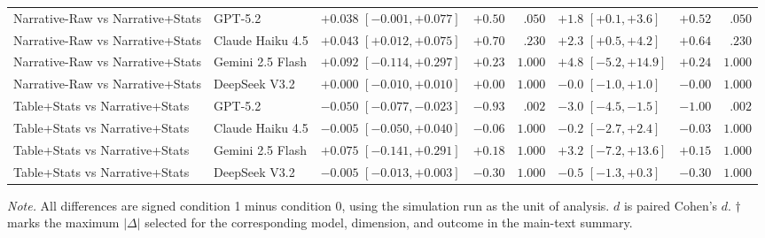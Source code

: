 \begin{table}[t]
\begin{tabular}{llp{3.1cm}rrp{3.1cm}rr}
Narrative-Raw vs Narrative+Stats & GPT-5.2 & $+0.038$ $[-0.001, +0.077]$ & $+0.50$ & $.050$ & $+1.8$ $[+0.1, +3.6]$ & $+0.52$ & $.050$ \\
Narrative-Raw vs Narrative+Stats & Claude Haiku 4.5 & $+0.043$ $[+0.012, +0.075]$ & $+0.70$ & $.230$ & $+2.3$ $[+0.5, +4.2]$ & $+0.64$ & $.230$ \\
Narrative-Raw vs Narrative+Stats & Gemini 2.5 Flash & $+0.092$ $[-0.114, +0.297]$ & $+0.23$ & $1.000$ & $+4.8$ $[-5.2, +14.9]$ & $+0.24$ & $1.000$ \\
Narrative-Raw vs Narrative+Stats & DeepSeek V3.2 & $+0.000$ $[-0.010, +0.010]$ & $+0.00$ & $1.000$ & $-0.0$ $[-1.0, +1.0]$ & $-0.00$ & $1.000$ \\
Table+Stats vs Narrative+Stats & GPT-5.2 & $-0.050$ $[-0.077, -0.023]$ & $-0.93$ & $.002$ & $-3.0$ $[-4.5, -1.5]$ & $-1.00$ & $.002$ \\
Table+Stats vs Narrative+Stats & Claude Haiku 4.5 & $-0.005$ $[-0.050, +0.040]$ & $-0.06$ & $1.000$ & $-0.2$ $[-2.7, +2.4]$ & $-0.03$ & $1.000$ \\
Table+Stats vs Narrative+Stats & Gemini 2.5 Flash & $+0.075$ $[-0.141, +0.291]$ & $+0.18$ & $1.000$ & $+3.2$ $[-7.2, +13.6]$ & $+0.15$ & $1.000$ \\
Table+Stats vs Narrative+Stats & DeepSeek V3.2 & $-0.005$ $[-0.013, +0.003]$ & $-0.30$ & $1.000$ & $-0.5$ $[-1.3, +0.3]$ & $-0.30$ & $1.000$ \\
\bottomrule
\end{tabular}
\vspace{2pt}
\parbox{0.99\textwidth}{\scriptsize \textit{Note.} All differences are signed condition 1 minus condition 0, using the simulation run as the unit of analysis. $d$ is paired Cohen's $d$. $\dagger$ marks the maximum $|\Delta|$ selected for the corresponding model, dimension, and outcome in the main-text summary.}
\end{table}
